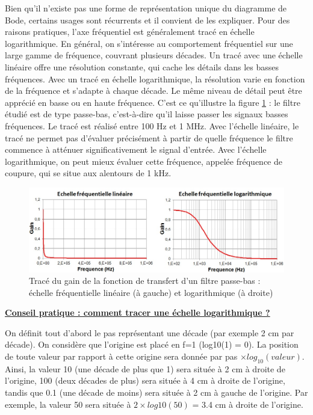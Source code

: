 	Bien qu'il n'existe pas une forme de représentation unique du diagramme de Bode, certains usages sont récurrents et il convient de les expliquer. Pour des raisons pratiques, l'axe fréquentiel est généralement tracé en échelle logarithmique. En général, on s'intéresse au comportement fréquentiel sur une large gamme de fréquence, couvrant plusieurs décades. Un tracé avec une échelle linéaire offre une résolution constante, qui cache les détails dans les basses fréquences. Avec un tracé en échelle logarithmique, la résolution varie en fonction de la fréquence et s'adapte à chaque décade. Le même niveau de détail peut être apprécié en basse ou en haute fréquence. C'est ce qu'illustre la figure \ref{Fig:Effet_Flin_log} : le filtre étudié est de type passe-bas, c'est-à-dire qu'il laisse passer les signaux basses fréquences. Le tracé est réalisé entre 100 Hz et 1 MHz. Avec l'échelle linéaire, le tracé ne permet pas d'évaluer précisément à partir de quelle fréquence le filtre commence à atténuer significativement le signal d'entrée. Avec l'échelle logarithmique, on peut mieux évaluer cette fréquence, appelée fréquence de coupure, qui se situe aux alentours de 1 kHz.
	\begin{figure}[h]
		\centering
		\includegraphics[scale=0.6]{images/Effet_Flin_log.jpg}
		\caption{Tracé du gain de la fonction de transfert d'un filtre passe-bas : échelle fréquentielle linéaire (à gauche) et logarithmique (à droite)}	
		\label{Fig:Effet_Flin_log} 
	\end{figure}
	
	\textbf{\underline{Conseil pratique : comment tracer une échelle logarithmique ?}}
	
	On définit tout d'abord le pas représentant une décade (par exemple 2 cm par décade). On considère que l'origine est placé en f=1 (log10(1) = 0). La position de toute valeur par rapport à cette origine sera donnée par pas $\times log_{10}(valeur)$. Ainsi, la valeur 10 (une décade de plus que 1) sera située à 2 cm à droite de l'origine, 100 (deux décades de plus) sera située à 4 cm à droite de l'origine, tandis que 0.1 (une décade de moins) sera située à 2 cm à gauche de l'origine. Par exemple, la valeur 50 sera située à $2\times log10(50)$ = 3.4 cm à droite de l'origine.\\
	
